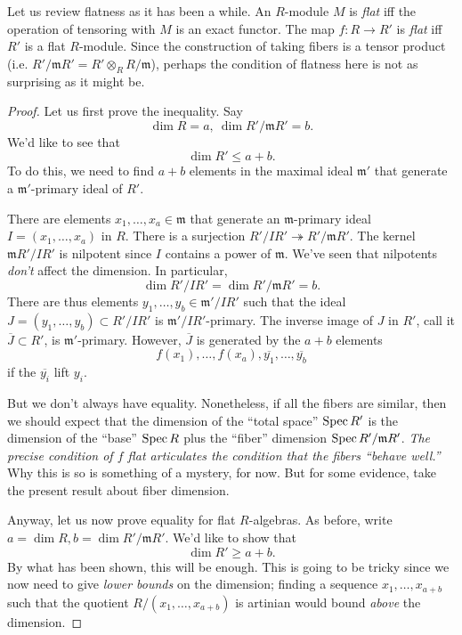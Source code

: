 \begin{remark} 
Let us review flatness as it has been a while. An $R$-module $M$ is \emph{flat} iff
the operation of tensoring with $M$ is an exact functor. The map $f: R \to R'$
is \emph{flat} iff $R'$ is a flat $R$-module. Since the construction of taking
fibers is a tensor product (i.e. $R'/\mathfrak{m}R' = R' \otimes_R
R/\mathfrak{m}$), perhaps the condition of flatness here is not as surprising as
it might be.
\end{remark} 

\begin{proof} 
Let us first prove the inequality. Say $$\dim R = a,  \ \dim R'/\mathfrak{m}R'
= b.$$ We'd like to see that
\[ \dim R' \leq a+b.  \]
To do this, we need to find $a+b$ elements in the maximal ideal $\mathfrak{m}'$
that generate a $\mathfrak{m}'$-primary ideal of $R'$. 

There are elements $x_1, \dots, x_a \in \mathfrak{m}$ that generate an
$\mathfrak{m}$-primary ideal $I = (x_1, \dots, x_a)$ in $R$. There is a surjection $R'/I R'
\twoheadrightarrow R'/\mathfrak{m}R'$.
The kernel $\mathfrak{m}R'/IR'$ is nilpotent since $I$ contains a power of
$\mathfrak{m}$. 	We've seen that nilpotents \emph{don't} affect the dimension.
In particular, 
\[ \dim R'/IR' = \dim R'/\mathfrak{m}R' = b.  \]
There are thus elements $y_1, \dots, y_b \in \mathfrak{m}'/IR'$ such that the
ideal $J = (y_1, \dots, y_b) \subset R'/I R'$ is $\mathfrak{m}'/IR'$-primary.
The inverse image of $J$ in $R'$, call it $\overline{J} \subset R'$, is
$\mathfrak{m}'$-primary. However, $\overline{J}$ is generated by the $a+b$
elements
\[ f(x_1), \dots, f(x_a), \overline{y_1}, \dots, \overline{y_b}  \]
if the $\overline{y_i}$ lift $y_i$. 

But we don't always have equality. Nonetheless, if all the fibers are similar,
then we should expect that the dimension of the ``total space'' $\operatorname{Spec} R'$ is
the dimension of the ``base'' $\operatorname{Spec} R$ plus the ``fiber'' dimension $\operatorname{Spec}
R'/\mathfrak{m}R'$.  
\emph{The precise condition of $f$ flat articulates the condition that the fibers
 ``behave well.'' }
Why this is so is something of a mystery, for now.
But for some evidence, take the present result about fiber dimension.

Anyway, let us now prove equality for flat $R$-algebras. As before, write $a =
\dim R, b = \dim R'/\mathfrak{m}R'$. We'd like to show that
\[ \dim R' \geq a+b.  \]
By what has been shown, this will be enough.
This is going to be tricky since we now need to give \emph{lower bounds} on the
dimension; finding a sequence $x_{1}, \dots, x_{a+b}$ such that the quotient
$R/(x_1, \dots, x_{a+b})$ is artinian would bound \emph{above} the dimension.


\end{proof}
